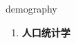 
\begin{frame}
{\huge demography}
\begin{center}
\begin{enumerate}\Large
  \item \textbf{人口统计学}
\end{enumerate}
\end{center}
\end{frame}
